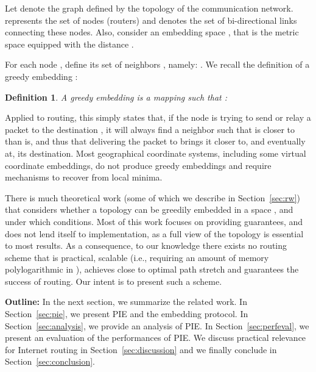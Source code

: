 \documentclass[conference]{IEEEtran}
\newtheorem{Definition}{Definition}[section]
\newcommand{\bDef}{ \begin{Definition} }
\newcommand{\eDef}{ \end{Definition} }
\begin{document}
Let  denote the graph defined by the topology of the communication network.  represents the set of nodes (routers) and  denotes the set of bi-directional links connecting these nodes. Also, consider an embedding space , that is the metric space  equipped with the distance .

For each node , define its set of neighbors , namely: . We recall the definition of a greedy embedding \cite{papadimitriou:conjecture}:

\bDef A greedy embedding is a mapping  such that :

\eDef
\vspace{0.2cm}
Applied to routing, this simply states that, if the node  is trying to send or relay a packet to the destination , it will always find a neighbor  such that  is closer to  than  is, and thus that delivering the packet to  brings it closer to, and eventually at, its destination. Most geographical coordinate systems, including some virtual coordinate embeddings, 
do not produce greedy embeddings 
and require mechanisms to recover from local minima. 




There is much theoretical work (some of which we describe in Section~\ref{sec:rw}) that considers whether a topology can be greedily embedded in a space , and under which conditions. Most of this work focuses on providing guarantees, and does not lend itself to implementation, as a full view of the topology is essential to most results.
As a consequence, to our knowledge there exists no routing scheme that is practical, scalable (i.e., requiring an amount of memory polylogarithmic in ), achieves close to optimal path stretch and guarantees the success of routing. Our intent is to present such a scheme.

























\textbf{Outline: }
In the next section, we summarize the related work. In Section~\ref{sec:pie}, we present PIE and the embedding protocol. In Section~\ref{sec:analysis}, we provide an analysis of PIE. 
In Section~\ref{sec:perfeval}, we present an evaluation of the performances of PIE. We discuss practical relevance for Internet routing in Section~\ref{sec:discussion} and we finally conclude in Section~\ref{sec:conclusion}.
\end{document}
